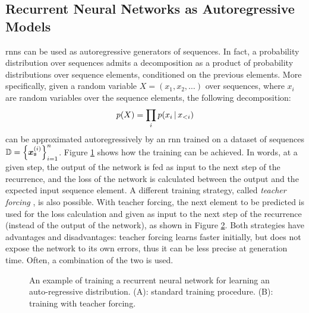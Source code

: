 \subsection{Recurrent Neural Networks as Autoregressive Models}
\glspl{rnn} can be used as autoregressive generators of sequences. In fact, a probability distribution over sequences admits a decomposition as a product of probability distributions over sequence elements, conditioned on the previous elements. More specifically, given a random variable $X = (x_1, x_2, \ldots)$ over sequences, where $x_i$ are random variables over the sequence elements, the following decomposition:
$$p(X) = \prod_i p(x_{i} \,|\, x_{<i})$$
can be approximated autoregressively by an \gls{rnn} trained on a dataset of sequences $\Data = \Set{\Vector{x}_{\Seq{s}}^{(i)}}_{i=1}^n$. Figure \ref{fig:auto-regressive} shows how the training can be achieved. In words, at a given step, the output of the network is fed as input to the next step of the recurrence, and the loss of the network is calculated between the output and the expected input sequence element. A different training strategy, called \emph{teacher forcing} \citep{williams1989teacherforcing}, is also possible. With teacher forcing, the next element to be predicted is used for the loss calculation and given as input to the next step of the recurrence (instead of the output of the network), as shown in Figure \ref{fig:teacher-forcing}. Both strategies have advantages and disadvantages: teacher forcing learns faster initially, but does not expose the network to its own errors, thus it can be less precise at generation time. Often, a combination of the two is used.
\begin{figure*}[h!]
    \begin{subfigure}[b]{0.49\linewidth}
        \centering
        \resizebox{.9\textwidth}{!}{}
        \caption{}
        \label{fig:auto-regressive}
    \end{subfigure}
    \begin{subfigure}[b]{0.49\linewidth}
        \centering
        \resizebox{.9\textwidth}{!}{}
        \caption{}
        \label{fig:teacher-forcing}
    \end{subfigure}
    \caption{An example of training a recurrent neural network for learning an auto-regressive distribution. (A): standard training procedure. (B): training with teacher forcing.}
    \label{fig:rnn-auto-regressive}
\end{figure*}
